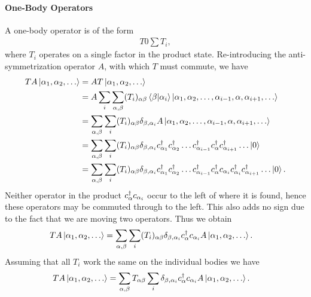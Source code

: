 \paragraph{One-Body Operators}
A one-body operator is of the form
\begin{align*}
	T 0 \sum T_{i},
\end{align*}
where $T_{i}$ operates on a single factor in the product state. Re-introducing the anti-symmetrization operator $A$, with which $T$ must commute, we have
\begin{align*}
	TA\ket{\alpha_{1}, \alpha_{2}, \dots} &= AT\ket{\alpha_{1}, \alpha_{2}, \dots} \\
	                                      &= A\sum\limits_{i}\sum\limits_{\alpha, \beta}(T_{i})_{\alpha\beta}\braket{\beta}{\alpha_{i}}\ket{\alpha_{1}, \alpha_{2}, \dots, \alpha_{i - 1}, \alpha, \alpha_{i + 1}, \dots} \\
	                                      &= \sum\limits_{\alpha, \beta}\sum\limits_{i}(T_{i})_{\alpha\beta}\delta_{\beta, \alpha_{i}}A\ket{\alpha_{1}, \alpha_{2}, \dots, \alpha_{i - 1}, \alpha, \alpha_{i + 1}, \dots} \\
	                                      &= \sum\limits_{\alpha, \beta}\sum\limits_{i}(T_{i})_{\alpha\beta}\delta_{\beta, \alpha_{i}}c_{\alpha_{1}}^{\dagger}c_{\alpha_{2}}^{\dagger}\dots c_{\alpha_{i - 1}}^{\dagger}c_{\alpha}^{\dagger}c_{\alpha_{i + 1}}^{\dagger}\dots\ket{0} \\
	                                      &= \sum\limits_{\alpha, \beta}\sum\limits_{i}(T_{i})_{\alpha\beta}\delta_{\beta, \alpha_{i}}c_{\alpha_{1}}^{\dagger}c_{\alpha_{2}}^{\dagger}\dots c_{\alpha_{i - 1}}^{\dagger}c_{\alpha}^{\dagger}c_{\alpha_{i}}c_{\alpha_{i}}^{\dagger}c_{\alpha_{i + 1}}^{\dagger}\dots\ket{0}.
\end{align*}
Neither operator in the product $c_{\alpha}^{\dagger}c_{\alpha_{i}}$ occur to the left of where it is found, hence these operators may be commuted through to the left. This also adds no sign due to the fact that we are moving two operators. Thus we obtain
\begin{align*}
	TA\ket{\alpha_{1}, \alpha_{2}, \dots} &= \sum\limits_{\alpha, \beta}\sum\limits_{i}(T_{i})_{\alpha\beta}\delta_{\beta, \alpha_{i}}c_{\alpha}^{\dagger}c_{\alpha_{i}}A\ket{\alpha_{1}, \alpha_{2}, \dots}.
\end{align*}
Assuming that all $T_{i}$ work the same on the individual bodies we have
\begin{align*}
	TA\ket{\alpha_{1}, \alpha_{2}, \dots} &= \sum\limits_{\alpha, \beta}T_{\alpha\beta}\sum\limits_{i}\delta_{\beta, \alpha_{i}}c_{\alpha}^{\dagger}c_{\alpha_{i}}A\ket{\alpha_{1}, \alpha_{2}, \dots}.
\end{align*}
